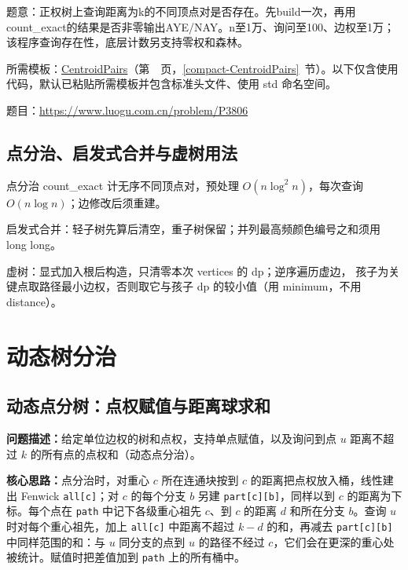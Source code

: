 题意：正权树上查询距离为k的不同顶点对是否存在。先build一次，再用count\_exact的结果是否非零输出AYE/NAY。n至1万、询问至100、边权至1万；该程序查询存在性，底层计数另支持零权和森林。

所需模板：\hyperref[compact-CentroidPairs]{CentroidPairs}（第~\pageref{compact-CentroidPairs}~页，\ref{compact-CentroidPairs}~节）。以下仅含使用代码，默认已粘贴所需模板并包含标准头文件、使用 std 命名空间。

题目：\url{https://www.luogu.com.cn/problem/P3806}



\subsection{点分治、启发式合并与虚树用法}\label{knowledge-tree-uses}
点分治 count\_exact 计无序不同顶点对，预处理 $O(n\log^2n)$，每次查询 $O(n\log n)$；边修改后须重建。

启发式合并：轻子树先算后清空，重子树保留；并列最高频颜色编号之和须用 long long。

虚树：显式加入根后构造，只清零本次 vertices 的 dp；逆序遍历虚边，
孩子为关键点取路径最小边权，否则取它与孩子 dp 的较小值（用 minimum，不用 distance）。


\Needspace{180pt}

\section{动态树分治}

\subsection{动态点分树：点权赋值与距离球求和}\label{compact-CentroidSum}

\noindent\textbf{问题描述：}\allowbreak 给定单位边权的树和点权，支持单点赋值，以及询问到点 $u$ 距离不超过 $k$ 的所有点的点权和（动态点分治）。

\textbf{核心思路：}\allowbreak 点分治时，对重心 $c$ 所在连通块按到 $c$ 的距离把点权放入桶，线性建出 Fenwick \texttt{all[c]}；对 $c$ 的每个分支 $b$ 另建 \texttt{part[c][b]}，同样以到 $c$ 的距离为下标。每个点在 \texttt{path} 中记下各级重心祖先 $c$、到 $c$ 的距离 $d$ 和所在分支 $b$。查询 $u$ 时对每个重心祖先，加上 \texttt{all[c]} 中距离不超过 $k-d$ 的和，再减去 \texttt{part[c][b]} 中同样范围的和：与 $u$ 同分支的点到 $u$ 的路径不经过 $c$，它们会在更深的重心处被统计。赋值时把差值加到 \texttt{path} 上的所有桶中。

